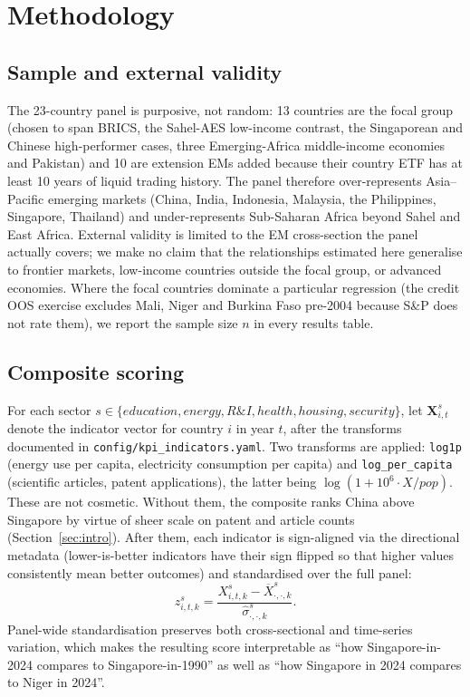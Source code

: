 \section{Methodology}\label{sec:methodology}

\subsection{Sample and external validity}\label{sec:sample_external_validity}

The 23-country panel is purposive, not random: 13 countries are the focal group (chosen to span BRICS, the Sahel-AES low-income contrast, the Singaporean and Chinese high-performer cases, three Emerging-Africa middle-income economies and Pakistan) and 10 are extension EMs added because their country ETF has at least 10 years of liquid trading history. The panel therefore over-represents Asia--Pacific emerging markets (China, India, Indonesia, Malaysia, the Philippines, Singapore, Thailand) and under-represents Sub-Saharan Africa beyond Sahel and East Africa. External validity is limited to the EM cross-section the panel actually covers; we make no claim that the relationships estimated here generalise to frontier markets, low-income countries outside the focal group, or advanced economies. Where the focal countries dominate a particular regression (the credit OOS exercise excludes Mali, Niger and Burkina Faso pre-2004 because S\&P does not rate them), we report the sample size $n$ in every results table.

\subsection{Composite scoring}

For each sector $s \in \{education, energy, R\&I, health, housing, security\}$, let $\bm{X}^s_{i,t}$ denote the indicator vector for country $i$ in year $t$, after the transforms documented in \texttt{config/kpi\_indicators.yaml}. Two transforms are applied: \texttt{log1p} (energy use per capita, electricity consumption per capita) and \texttt{log\_per\_capita} (scientific articles, patent applications), the latter being $\log(1 + 10^6 \cdot X / pop)$. These are not cosmetic. Without them, the composite ranks China above Singapore by virtue of sheer scale on patent and article counts (Section~\ref{sec:intro}). After them, each indicator is sign-aligned via the directional metadata (lower-is-better indicators have their sign flipped so that higher values consistently mean better outcomes) and standardised over the full panel:
\[
  z^s_{i,t,k} = \frac{X^s_{i,t,k} - \overline{X}^s_{\cdot,\cdot,k}}{\hat{\sigma}^s_{\cdot,\cdot,k}}.
\]
Panel-wide standardisation preserves both cross-sectional and time-series variation, which makes the resulting score interpretable as ``how Singapore-in-2024 compares to Singapore-in-1990'' as well as ``how Singapore in 2024 compares to Niger in 2024''.

